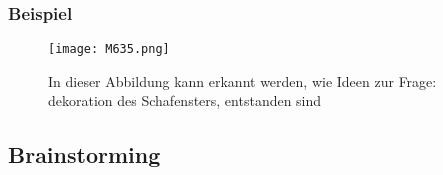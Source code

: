 \subsubsection{Beispiel}
\begin{figure}[H]
	\centering
	\texttt{[image: M635.png]}
	\caption{In dieser Abbildung kann erkannt werden, wie Ideen zur Frage: dekoration des Schafensters, entstanden sind}
\end{figure}
\newpage
\subsection{Brainstorming}\label{subsec:Brainstorming}
